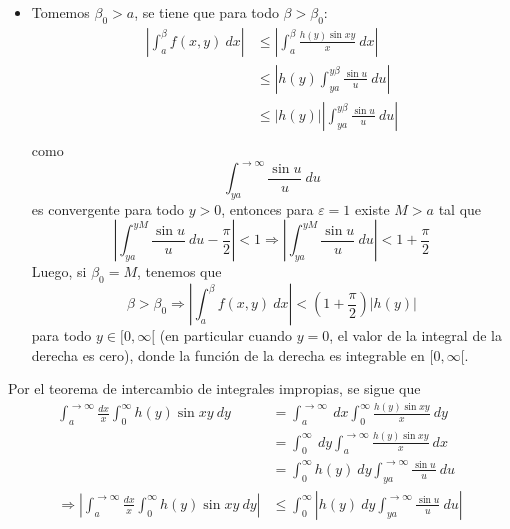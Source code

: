\documentclass[12pt]{report}
\theoremstyle{largebreak}
\renewcommand{\leq}{\ensuremath{\leqslant}}
\newcommand\abs[1]{\ensuremath{\left|#1\right|}}
\begin{document}
\begin{sol}
\begin{itemize}
            \item Tomemos $\beta_0>a$, se tiene que para todo $\beta>\beta_0$:
            \begin{equation*}
                \begin{split}
                    \abs{\int_{a}^{\beta}f(x,y)\:dx}&\leq\abs{\int_{a}^{\beta}\frac{h(y)\sin xy}{x}\:dx}\\
                    &\leq\abs{h(y)\int_{ya}^{y\beta}\frac{\sin u}{u}\:du}\\
                    &\leq\abs{h(y)}\abs{\int_{ya}^{y\beta}\frac{\sin u}{u}\:du}\\
                \end{split}
            \end{equation*}
            como
            \begin{equation*}
                \int_{ya}^{ \rightarrow\infty}\frac{\sin u}{u}\:du
            \end{equation*}
            es convergente para todo $y>0$, entonces para $\varepsilon=1$ existe $M>a$ tal que
            \begin{equation*}
                \abs{\int_{ ya}^{yM}\frac{\sin u}{u}\:du-\frac{\pi}{2}}<1\Rightarrow\abs{\int_{ ya}^{yM}\frac{\sin u}{u}\:du}<1+\frac{\pi}{2}
            \end{equation*}
            Luego, si $\beta_0=M$, tenemos que
            \begin{equation*}
                \beta>\beta_0\Rightarrow\abs{\int_{a}^{\beta}f(x,y)\:dx}<\left(1+\frac{\pi}{2}\right)\abs{h(y)}
            \end{equation*}
            para todo $y\in[0,\infty[$ (en particular cuando $y=0$, el valor de la integral de la derecha es cero), donde la función de la derecha es integrable en $[0,\infty[$.
        \end{itemize}
        Por el teorema de intercambio de integrales impropias, se sigue que
        \begin{equation*}
            \begin{split}
                \int_{a}^{ \rightarrow\infty}\frac{dx}{x}\int_0^{\infty}h(y)\sin xy\:dy&=\int_{a}^{ \rightarrow\infty}\:dx\int_0^{\infty}\frac{h(y)\sin xy}{x}\:dy\\
                &=\int_0^{\infty}\:dy\int_{a}^{ \rightarrow\infty}\frac{h(y)\sin xy}{x}\:dx\\
                &=\int_0^{\infty}h(y)\:dy\int_{ya}^{ \rightarrow\infty}\frac{\sin u}{u}\:du\\
                \Rightarrow\abs{\int_{a}^{ \rightarrow\infty}\frac{dx}{x}\int_0^{\infty}h(y)\sin xy\:dy}&\leq\int_0^{\infty}\abs{h(y)\:dy\int_{ya}^{ \rightarrow\infty}\frac{\sin u}{u}\:du}\\

\end{split}
\end{equation*}
\end{sol}
\end{document}
